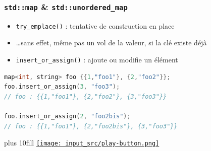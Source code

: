 \documentclass[C++.tex]{subfiles}
\begin{document}
\begin{frame}[fragile]
	\frametitle{\lstinline|std::map| \& \lstinline|std::unordered_map|}
	\begin{itemize}
		\item \lstinline|try_emplace()| : tentative de construction en place
		\item \ldots sans effet, même pas un \og vol\fg{} de la valeur, si la clé existe déjà
		\item \lstinline|insert_or_assign()| : ajoute ou modifie un élément
	\end{itemize}

	\begin{lstlisting}[language=C++]
map<int, string> foo {{1,"foo1"}, {2,"foo2"}};
foo.insert_or_assign(3, "foo3");
// foo : {{1,"foo1"}, {2,"foo2"}, {3,"foo3"}}

foo.insert_or_assign(2, "foo2bis");
// foo : {{1,"foo1"}, {2,"foo2bis"}, {3,"foo3"}}\end{lstlisting}

	\vskip 10mm plus 10fill
	\hfill
	\href{https://godbolt.org/#g:!((g:!((g:!((h:codeEditor,i:(filename:'1',fontScale:14,fontUsePx:'0',j:1,lang:c%2B%2B,selection:(endColumn:1,endLineNumber:22,positionColumn:1,positionLineNumber:22,selectionStartColumn:1,selectionStartLineNumber:22,startColumn:1,startLineNumber:22),source:'%23include+%3Ciostream%3E%0A%23include+%3Cmap%3E%0A%23include+%3Cstring%3E%0A%0Aint+main()%0A%7B%0A++std::map%3Cint,+std::string%3E+foo+%7B%7B1,%22foo1%22%7D,+%7B2,%22foo2%22%7D%7D%3B%0A%0A++foo.insert_or_assign(3,+%22foo3%22)%3B%0A++for(const+auto%26+%5Bk,v%5D+:+foo)%0A++%7B%0A++++std::cout+%3C%3C+k+%3C%3C+!'-!'+%3C%3C+v+%3C%3C+!'+!'%3B%0A++%7D%0A++std::cout+%3C%3C+!'%5Cn!'%3B%0A%0A++foo.insert_or_assign(2,+%22foo2bis%22)%3B%0A++for(const+auto%26+%5Bk,v%5D+:+foo)%0A++%7B%0A++++std::cout+%3C%3C+k+%3C%3C+!'-!'+%3C%3C+v+%3C%3C+!'+!'%3B%0A++%7D%0A++std::cout+%3C%3C+!'%5Cn!'%3B%0A%7D%0A'),l:'5',n:'0',o:'C%2B%2B+source+%231',t:'0')),k:50,l:'4',n:'0',o:'',s:0,t:'0'),(g:!((h:executor,i:(argsPanelShown:'1',compilationPanelShown:'0',compiler:g112,compilerOutShown:'0',execArgs:'',execStdin:'',fontScale:14,fontUsePx:'0',j:1,lang:c%2B%2B,libs:!((name:boost,ver:'175')),options:'-std%3Dc%2B%2B17',source:1,stdinPanelShown:'1',tree:'1',wrap:'0'),l:'5',n:'0',o:'Executor+x86-64+gcc+11.2+(C%2B%2B,+Editor+%231)',t:'0')),header:(),k:50,l:'4',n:'0',o:'',s:0,t:'0')),l:'2',n:'0',o:'',t:'0')),version:4}{\texttt{[image: input\_src/play-button.png]}}
\end{frame}
\end{document}
